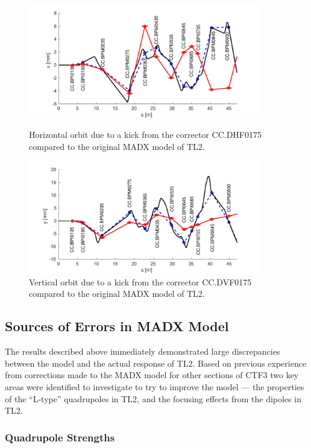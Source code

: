 \begin{figure}
  \centering
  \includegraphics[width=0.9\textwidth]{Figures/optics/modelOriginalH}
  \caption{Horizontal orbit due to a kick from the corrector CC.DHF0175 compared to the original MADX model of TL2.}
  \label{f:modelOriginalH}
  \includegraphics[width=0.9\textwidth]{Figures/optics/modelOriginalV}
  \caption{Vertical orbit due to a kick from the corrector CC.DVF0175 compared to the original MADX model of TL2.}
  \label{f:modelOriginalV}
\end{figure}

\subsection{Sources of Errors in MADX Model}
\label{ss:modelErrorSources}

The results described above immediately demonstrated large discrepancies between the model and the actual response of TL2. Based on previous experience from corrections made to the MADX model for other sections of CTF3 \cite{benOptics} two key areas were identified to investigate to try to improve the model --- the properties of the ``L-type'' quadrupoles in TL2, and the focusing effects from the dipoles in TL2.

\subsubsection{Quadrupole Strengths}
\label{sss:quadStrengths}

